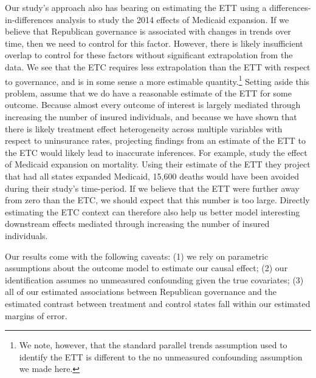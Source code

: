 \documentclass[12pt]{article}
\begin{document}
Our study's approach also has bearing on estimating the ETT using a differences-in-differences analysis to study the 2014 effects of Medicaid expansion. If we believe that Republican governance is associated with changes in trends over time, then we need to control for this factor. However, there is likely insufficient overlap to control for these factors without significant extrapolation from the data. We see that the ETC requires less extrapolation than the ETT with respect to governance, and is in some sense a more estimable quantity.\footnote{We note, however, that the standard parallel trends assumption used to identify the ETT is different to the no unmeasured confounding assumption we made here.} Setting aside this problem, assume that we do have a reasonable estimate of the ETT for some outcome. Because almost every outcome of interest is largely mediated through increasing the number of insured individuals, and because we have shown that there is likely treatment effect heterogeneity across multiple variables with respect to uninsurance rates, projecting findings from an estimate of the ETT to the ETC would likely lead to inaccurate inferences. For example, \cite{miller2019medicaid} study the effect of Medicaid expansion on mortality. Using their estimate of the ETT they project that had all states expanded Medicaid, 15,600 deaths would have been avoided during their study's time-period. If we believe that the ETT were further away from zero than the ETC, we should expect that this number is too large. Directly estimating the ETC context can therefore also help us better model interesting downstream effects mediated through increasing the number of insured individuals. 

Our results come with the following caveats: (1) we rely on parametric assumptions about the outcome model to estimate our causal effect; (2) our identification assumes no unmeasured confounding given the true covariates; (3) all of our estimated associations between Republican governance and the estimated contrast between treatment and control states fall within our estimated margins of error. 
\end{document}
